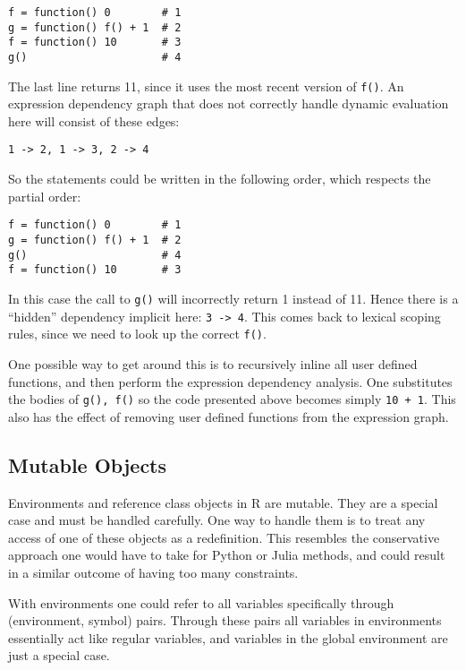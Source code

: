 \documentclass[12pt]{article}
\begin{document}
\begin{verbatim}
f = function() 0        # 1
g = function() f() + 1  # 2
f = function() 10       # 3
g()                     # 4
\end{verbatim}

The last line returns 11, since it uses the most recent version of \texttt{f()}.
An expression dependency graph that does not correctly handle dynamic
evaluation here will consist of these edges:

\begin{verbatim}
1 -> 2, 1 -> 3, 2 -> 4
\end{verbatim}

So the statements could be written in the following order, which respects
the partial order:

\begin{verbatim}
f = function() 0        # 1
g = function() f() + 1  # 2
g()                     # 4
f = function() 10       # 3
\end{verbatim}

In this case the call to \texttt{g()} will incorrectly return 1 instead of 11.
Hence there is a ``hidden'' dependency implicit here: \texttt{3 -> 4}.
This comes back to lexical scoping rules, since we need to look up the
correct \texttt{f()}.

One possible way to get around this is to recursively inline all user
defined functions, and then perform the expression dependency analysis. One
substitutes the bodies of \texttt{g(), f()} so the code presented above
becomes simply \texttt{10 + 1}. This also has the effect of removing user
defined functions from the expression graph.

\subsection{Mutable Objects}

Environments and reference class objects in R are mutable. They are a
special case and must be handled carefully. One way to handle them is to
treat any access of one of these objects as a redefinition. This resembles
the conservative approach one would have to take for Python or Julia
methods, and could result in a similar outcome of having too many
constraints.

With environments one could refer to all variables specifically through
(environment, symbol) pairs. Through these pairs all variables in
environments essentially act like regular variables, and variables in the
global environment are just a special case.
\end{document}
